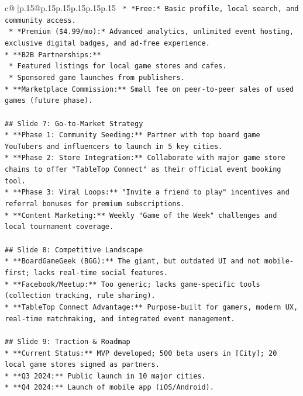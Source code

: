 \documentclass{article}
\begin{document}
{\begin{supertabular}{c@{$\;$}|p{.15\linewidth}@{}p{.15\linewidth}p{.15\linewidth}p{.15\linewidth}p{.15\linewidth}p{.15\linewidth}}
{{{\texttt{    *   *Free:* Basic profile, local search, and community access.} \\
\texttt{    *   *Premium (\$4.99/mo):* Advanced analytics, unlimited event hosting, exclusive digital badges, and ad{-}free experience.} \\
\texttt{*   **B2B Partnerships:**} \\
\texttt{    *   Featured listings for local game stores and cafes.} \\
\texttt{    *   Sponsored game launches from publishers.} \\
\texttt{*   **Marketplace Commission:** Small fee on peer{-}to{-}peer sales of used games (future phase).} \\
\\ 
\texttt{\#\# Slide 7: Go{-}to{-}Market Strategy} \\
\texttt{*   **Phase 1: Community Seeding:** Partner with top board game YouTubers and influencers to launch in 5 key cities.} \\
\texttt{*   **Phase 2: Store Integration:** Collaborate with major game store chains to offer "TableTop Connect" as their official event booking tool.} \\
\texttt{*   **Phase 3: Viral Loops:** "Invite a friend to play" incentives and referral bonuses for premium subscriptions.} \\
\texttt{*   **Content Marketing:** Weekly "Game of the Week" challenges and local tournament coverage.} \\
\\ 
\texttt{\#\# Slide 8: Competitive Landscape} \\
\texttt{*   **BoardGameGeek (BGG):** The giant, but outdated UI and not mobile{-}first; lacks real{-}time social features.} \\
\texttt{*   **Facebook/Meetup:** Too generic; lacks game{-}specific tools (collection tracking, rule sharing).} \\
\texttt{*   **TableTop Connect Advantage:** Purpose{-}built for gamers, modern UX, real{-}time matchmaking, and integrated event management.} \\
\\ 
\texttt{\#\# Slide 9: Traction \& Roadmap} \\
\texttt{*   **Current Status:** MVP developed; 500 beta users in {[}City{]}; 20 local game stores signed as partners.} \\
\texttt{*   **Q3 2024:** Public launch in 10 major cities.} \\
\texttt{*   **Q4 2024:** Launch of mobile app (iOS/Android).} \\
}}}
\end{supertabular}}
\end{document}
